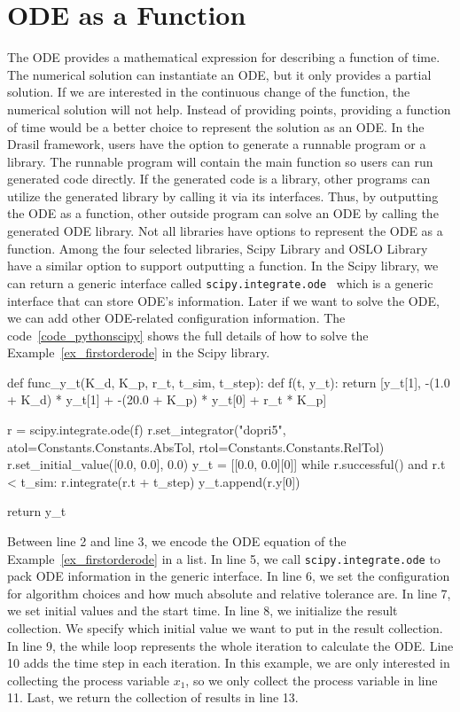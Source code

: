 \section{ODE as a Function}
The ODE provides a mathematical expression for describing a function of time. The numerical solution can instantiate an ODE, but it only provides a partial solution. If we are interested in the continuous change of the function, the numerical solution will not help. Instead of providing points, providing a function of time would be a better choice to represent the solution as an ODE. In the Drasil framework, users have the option to generate a runnable program or a library. The runnable program will contain the main function so users can run generated code directly. If the generated code is a library, other programs can utilize the generated library by calling it via its interfaces. Thus, by outputting the ODE as a function, other outside program can solve an ODE by calling the generated ODE library. Not all libraries have options to represent the ODE as a function. Among the four selected libraries, Scipy Library and OSLO Library have a similar option to support outputting a function. In the Scipy library, we can return a generic interface called \verb|scipy.integrate.ode|~\citep{scipyfun} which is a generic interface that can store ODE's information. Later if we want to solve the ODE, we can add other ODE-related configuration information. The code~\ref{code_pythonscipy} shows the full details of how to solve the Example~\ref{ex_firstorderode} in the Scipy library.

\begin{listing}[ht]
\begin{python1}
def func_y_t(K_d, K_p, r_t, t_sim, t_step):
    def f(t, y_t):
        return [y_t[1], -(1.0 + K_d) * y_t[1] + -(20.0 + K_p) * y_t[0] + r_t * K_p]
    
    r = scipy.integrate.ode(f)
    r.set_integrator("dopri5", atol=Constants.Constants.AbsTol, rtol=Constants.Constants.RelTol)
    r.set_initial_value([0.0, 0.0], 0.0)
    y_t = [[0.0, 0.0][0]]
    while r.successful() and r.t < t_sim:
        r.integrate(r.t + t_step)
        y_t.append(r.y[0])
    
    return y_t
\end{python1}
\label{code_pythonscipy}
\end{listing}

Between line 2 and line 3, we encode the ODE equation of the Example~\ref{ex_firstorderode} in a list. In line 5, we call \verb|scipy.integrate.ode| to pack ODE information in the generic interface. In line 6, we set the configuration for algorithm choices and how much absolute and relative tolerance are. In line 7, we set initial values and the start time. In line 8, we initialize the result collection. We specify which initial value we want to put in the result collection. In line 9, the while loop represents the whole iteration to calculate the ODE.  Line 10 adds the time step in each iteration. In this example, we are only interested in collecting the process variable $x_1$, so we only collect the process variable in line 11. Last, we return the collection of results in line 13.


